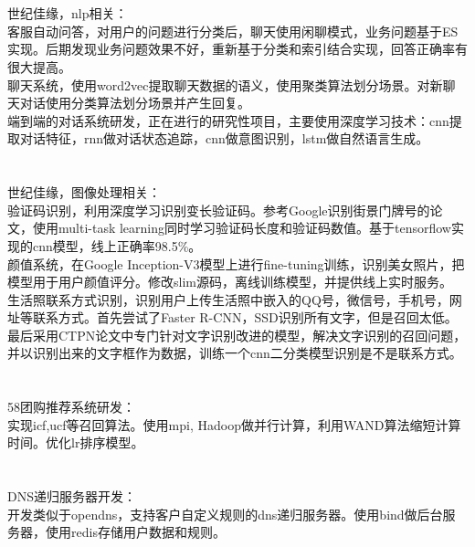 \documentclass[11pt, a4paper]{article}
\begin{document}
\\
\\
世纪佳缘，nlp相关： \\
客服自动问答，对用户的问题进行分类后，聊天使用闲聊模式，业务问题基于ES实现。后期发现业务问题效果不好，重新基于分类和索引结合实现，回答正确率有很大提高。 \\
聊天系统，使用word2vec提取聊天数据的语义，使用聚类算法划分场景。对新聊天对话使用分类算法划分场景并产生回复。 \\
端到端的对话系统研发，正在进行的研究性项目，主要使用深度学习技术：cnn提取对话特征，rnn做对话状态追踪，cnn做意图识别，lstm做自然语言生成。 \\
\\
\\
世纪佳缘，图像处理相关： \\
验证码识别，利用深度学习识别变长验证码。参考Google识别街景门牌号的论文，使用multi-task learning同时学习验证码长度和验证码数值。基于tensorflow实现的cnn模型，线上正确率98.5\%。 \\
颜值系统，在Google Inception-V3模型上进行fine-tuning训练，识别美女照片，把模型用于用户颜值评分。修改slim源码，离线训练模型，并提供线上实时服务。 \\
生活照联系方式识别，识别用户上传生活照中嵌入的QQ号，微信号，手机号，网址等联系方式。首先尝试了Faster R-CNN，SSD识别所有文字，但是召回太低。最后采用CTPN论文中专门针对文字识别改进的模型，解决文字识别的召回问题，并以识别出来的文字框作为数据，训练一个cnn二分类模型识别是不是联系方式。 \\
\\
\\
58团购推荐系统研发： \\
实现icf,ucf等召回算法。使用mpi, Hadoop做并行计算，利用WAND算法缩短计算时间。优化lr排序模型。 \\
\\
\\
DNS递归服务器开发： \\
开发类似于opendns，支持客户自定义规则的dns递归服务器。使用bind做后台服务器，使用redis存储用户数据和规则。 \\
\end{document}
